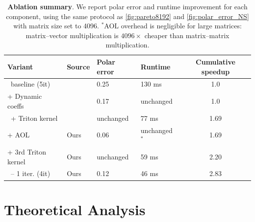     \begin{table}[t]
        \centering
        \begin{tabular}{l l l l c}
            \toprule
            Variant & Source & Polar error & Runtime & Cumulative speedup\\
            \midrule
            \color{muoncolor}{Muon:}\color{black}~baseline  (5it) & \cite{jordan2024muon}& 0.25 & 130 ms & 1.0\\
            + Dynamic coeffs & \cite{cesista2025muonoptcoeffs}  & 0.17 & unchanged & 1.0\\
            \color{dioncolor}{Muon+:}\color{black}~+ Triton kernel& \cite{ahn_dion_2025} & unchanged & 77 ms  & 1.69 \\
            + AOL & Ours & 0.06 & unchanged $^\ast$ & 1.69\\ 
            + 3rd Triton kernel & Ours & unchanged & 59 ms & 2.20\\
            \color{turbomuoncolor}{\turbomuon:}\color{black}~-- 1 iter. (4it) & Ours & 0.12 & 46 ms & 2.83 \\
            \bottomrule
        \end{tabular}
        \vspace{3mm}
        \caption{\textbf{Ablation summary}. We report polar error and runtime improvement for each component, using the same protocol as \cref{fig:pareto8192} and \cref{fig:polar_error_NS} with matrix size set to  4096. $^\ast$AOL overhead is negligible for large matrices: matrix--vector multiplication is $4096\times$ cheaper than matrix--matrix multiplication.}
        \label{tab:ablation_4096}
    \end{table}


\section{Theoretical Analysis}
\label{sec:steepest}

